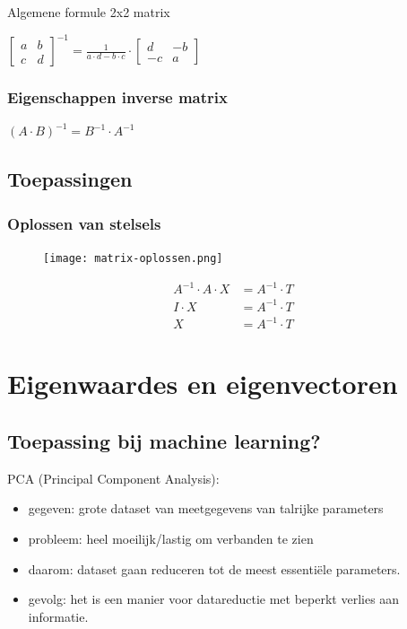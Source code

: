 \documentclass{article}
\begin{document}
Algemene formule 2x2 matrix

$\begin{bmatrix}
a & b\\
c & d
\end{bmatrix}^{-1} = \frac{1}{a\cdot d - b\cdot c}\cdot 
\begin{bmatrix}
d & -b\\
-c & a
\end{bmatrix}$

\subsubsection{Eigenschappen inverse matrix}

$(A\cdot B)^{-1} = B^{-1}\cdot A^{-1}$



\subsection{Toepassingen}

\subsubsection{Oplossen van stelsels}

\begin{figure}[H]
    \centering
    \texttt{[image: matrix-oplossen.png]}
\end{figure}

\begin{align*}
    A^{-1} \cdot A \cdot X & = A^{-1}\cdot T\\
    I\cdot X & = A^{-1} \cdot T\\
    X & = A^{-1}\cdot T
\end{align*}

\section{Eigenwaardes en eigenvectoren}

\subsection{Toepassing bij machine learning?}

PCA (Principal Component Analysis):

\begin{itemize}
    \item gegeven: grote dataset van meetgegevens van talrijke parameters
    \item probleem: heel moeilijk/lastig om verbanden te zien
    \item daarom: dataset gaan reduceren tot de meest essentiële parameters.
    \item gevolg: het is een manier voor datareductie met beperkt verlies aan informatie.
\end{itemize}
\end{document}
